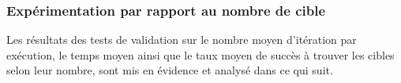 




\subsubsection{Expérimentation par rapport au nombre de cible}
Les résultats des tests de validation sur le nombre moyen d'itération par exécution, le temps moyen ainsi que le taux moyen de succès à trouver les cibles selon leur nombre, sont mis en évidence et analysé dans ce qui suit.

%		

